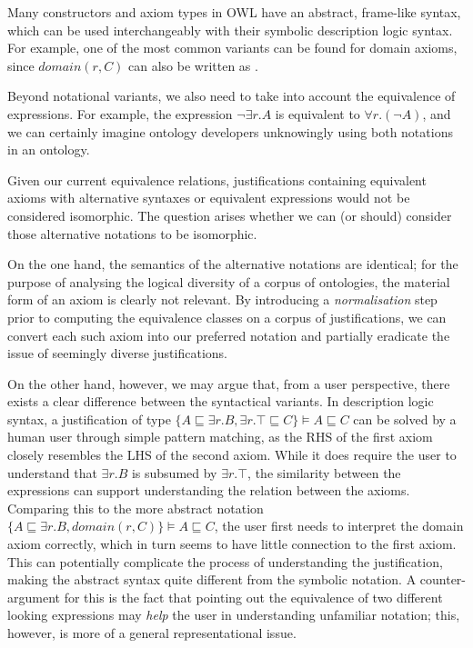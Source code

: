 Many constructors and axiom types in OWL have an abstract, frame-like syntax, which can be used interchangeably with their symbolic description logic syntax. For example, one of the most common variants can be found for domain axioms, since $domain(r,C)$ can also be written as . 

Beyond notational variants, we also need to take into account the equivalence of expressions. For example, the expression $\neg \exists r.A$ is equivalent to $\forall r.(\neg A)$, and we can certainly imagine ontology developers unknowingly using both notations in an ontology.

Given our current equivalence relations, justifications containing equivalent axioms with alternative syntaxes or equivalent expressions would not be considered isomorphic. The question arises whether we can (or should) consider those alternative notations to be isomorphic.

On the one hand, the semantics of the alternative notations are identical; for the purpose of analysing the logical diversity of a corpus of ontologies, the material form of an axiom is clearly not relevant. By introducing a \emph{normalisation} step prior to computing the equivalence classes on a corpus of justifications, we can convert each such axiom into our preferred notation and partially eradicate the issue of seemingly diverse justifications.

On the other hand, however, we may argue that, from a user perspective, there exists a clear difference between the syntactical variants. In description logic syntax, a justification of type $\{A \sqsubseteq \exists r.B, \exists r.\top \sqsubseteq C\} \models A \sqsubseteq C$ can be solved by a human user through simple pattern matching, as the RHS of the first axiom closely resembles the LHS of the second axiom. While it does require the user to understand that $\exists r.B$ is subsumed by $\exists r.\top$, the similarity between the expressions can support understanding the relation between the axioms. Comparing this to the more abstract notation $\{A \sqsubseteq \exists r.B, domain(r,C)\} \models A \sqsubseteq C$, the user first needs to interpret the domain axiom correctly, which in turn seems to have little connection to the first axiom. This can potentially complicate the process of understanding the justification, making the abstract syntax quite different from the symbolic notation. A counter-argument for this is the fact that pointing out the equivalence of two different looking expressions may \emph{help} the user in understanding unfamiliar notation; this, however, is more of a general representational issue.

